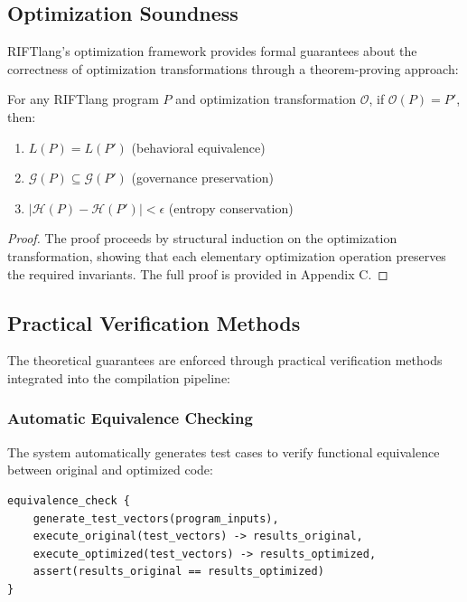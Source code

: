 \subsection{Optimization Soundness}

RIFTlang's optimization framework provides formal guarantees about the correctness of optimization transformations through a theorem-proving approach:

\begin{theorem}
For any RIFTlang program $P$ and optimization transformation $\mathcal{O}$, if $\mathcal{O}(P) = P'$, then:
\begin{enumerate}
\item $L(P) = L(P')$ (behavioral equivalence)
\item $\mathcal{G}(P) \subseteq \mathcal{G}(P')$ (governance preservation)
\item $|\mathcal{H}(P) - \mathcal{H}(P')| < \epsilon$ (entropy conservation)
\end{enumerate}
\end{theorem}

\begin{proof}
The proof proceeds by structural induction on the optimization transformation, showing that each elementary optimization operation preserves the required invariants. The full proof is provided in Appendix C.
\end{proof}

\subsection{Practical Verification Methods}

The theoretical guarantees are enforced through practical verification methods integrated into the compilation pipeline:

\subsubsection{Automatic Equivalence Checking}

The system automatically generates test cases to verify functional equivalence between original and optimized code:

\begin{lstlisting}[style=riftlang, language=rift]
equivalence_check {
    generate_test_vectors(program_inputs),
    execute_original(test_vectors) -> results_original,
    execute_optimized(test_vectors) -> results_optimized,
    assert(results_original == results_optimized)
}
\end{lstlisting}

